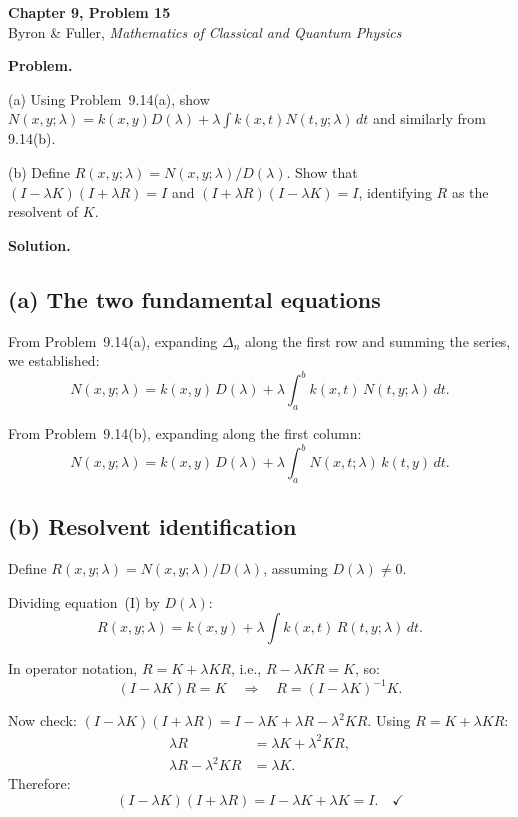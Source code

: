 \documentclass[12pt]{article}
\begin{document}
\begin{center}
{\Large\bfseries Chapter 9, Problem 15}\\[6pt]
Byron \& Fuller, \textit{Mathematics of Classical and Quantum Physics}
\end{center}

\bigskip

\textbf{Problem.}

(a) Using Problem~9.14(a), show $N(x,y;\lambda) = k(x,y)D(\lambda) + \lambda\int k(x,t)N(t,y;\lambda)\,dt$ and similarly from 9.14(b).

(b) Define $R(x,y;\lambda) = N(x,y;\lambda)/D(\lambda)$. Show that $(I - \lambda K)(I + \lambda R) = I$ and $(I + \lambda R)(I - \lambda K) = I$, identifying $R$ as the resolvent of $K$.

\bigskip
\textbf{Solution.}

\subsection*{(a) The two fundamental equations}

From Problem~9.14(a), expanding $\Delta_n$ along the first row and summing the series, we established:
\[
N(x,y;\lambda) = k(x,y)\,D(\lambda) + \lambda\int_a^b k(x,t)\,N(t,y;\lambda)\,dt. \tag{I}
\]

From Problem~9.14(b), expanding along the first column:
\[
N(x,y;\lambda) = k(x,y)\,D(\lambda) + \lambda\int_a^b N(x,t;\lambda)\,k(t,y)\,dt. \tag{II}
\]

\subsection*{(b) Resolvent identification}

Define $R(x,y;\lambda) = N(x,y;\lambda)/D(\lambda)$, assuming $D(\lambda) \neq 0$.

Dividing equation~(I) by $D(\lambda)$:
\[
R(x,y;\lambda) = k(x,y) + \lambda\int k(x,t)\,R(t,y;\lambda)\,dt.
\]

In operator notation, $R = K + \lambda KR$, i.e., $R - \lambda KR = K$, so:
\[
(I - \lambda K)R = K \quad \Longrightarrow \quad R = (I - \lambda K)^{-1}K.
\]

Now check: $(I - \lambda K)(I + \lambda R) = I - \lambda K + \lambda R - \lambda^2 KR$. Using $R = K + \lambda KR$:
\begin{align}
\lambda R &= \lambda K + \lambda^2 KR, \\
\lambda R - \lambda^2 KR &= \lambda K.
\end{align}
Therefore:
\[
(I - \lambda K)(I + \lambda R) = I - \lambda K + \lambda K = I. \quad \checkmark
\]
\end{document}
